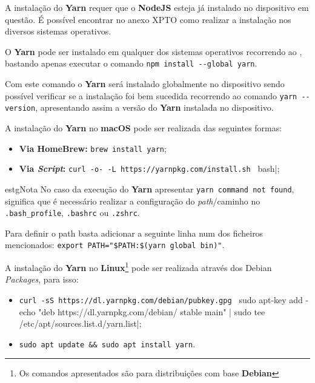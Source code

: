 \label{yarnAttachments}


A instalação do \textbf{Yarn} requer que o \textbf{NodeJS} esteja já instalado no dispositivo em questão. É possível encontrar no anexo XPTO como realizar a instalação nos diversos sistemas operativos.


O \textbf{Yarn} pode ser instalado em qualquer dos sistemas operativos recorrendo ao \textbf{}, bastando apenas executar o comando \verb|npm install --global yarn|.

Com este comando o \textbf{Yarn} será instalado globalmente no dispositivo sendo possível verificar se a instalação foi bem sucedida recorrendo ao comando \verb|yarn --version|, apresentando assim a versão do \textbf{Yarn} instalada no dispositivo. 


A instalação do \textbf{Yarn} no \textbf{macOS} pode ser realizada das seguintes formas:

\begin{itemize}
	\item \textbf{Via HomeBrew:} \verb|brew install yarn|;
	\item \textbf{Via \textit{Script}:} \verb|curl -o- -L https://yarnpkg.com/install.sh | bash|; 
\end{itemize}

\begin{mybox}{estg}{Nota}
	No caso da execução do \textbf{Yarn} apresentar \verb|yarn command not found|, significa que é necessário realizar a configuração do \textit{path}/caminho no \verb|.bash_profile|, \verb|.bashrc| ou \verb|.zshrc|.
	
	\vspace{5pt}
	
	Para definir o path basta adicionar a seguinte linha num dos ficheiros mencionados: \verb|export PATH="$PATH:$(yarn global bin)"|.
\end{mybox}


A instalação do \textbf{Yarn} no \textbf{Linux}\footnote{Os comandos apresentados são para distribuições com base \textbf{Debian}} pode ser realizada através dos Debian \textit{Packages}, para isso:

\begin{itemize}
	\item \verb|curl -sS https://dl.yarnpkg.com/debian/pubkey.gpg | sudo apt-key add -
echo "deb https://dl.yarnpkg.com/debian/ stable main" | sudo tee /etc/apt/sources.list.d/yarn.list|;
	\item \verb|sudo apt update && sudo apt install yarn|.
\end{itemize}

